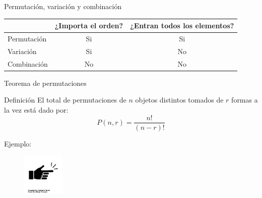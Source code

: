 \documentclass{beamer}
\begin{document}
\begin{frame}{Permutaci\'on, variaci\'on y combinaci\'on}

  \begin{tabular}{lcc}
     & ¿Importa el orden?  & ¿Entran todos los elementos? \\
    \hline
    \hline
     Permutaci\'on & Si                  &   Si    \\
     Variaci\'on   & Si                  &   No    \\
     Combinaci\'on & No                  &   No
  \end{tabular}

\end{frame}

\begin{frame}{Teorema de permutaciones}

  \begin{block}{Definici\'on}
    El total de permutaciones de $n$ objetos distintos tomados de $r$ formas a la
    vez est\'a dado por:
    \begin{equation}
        P(n,r) =  \frac{n !}{(n - r)!}
    \end{equation}
  \end{block}

  Ejemplo:
  
  \begin{figure}
    \includegraphics[width=2cm,angle=0,trim={1mm 216mm 1mm 200mm},clip]{figures/example-finger.png}
  \end{figure}

\end{frame}
\end{document}
